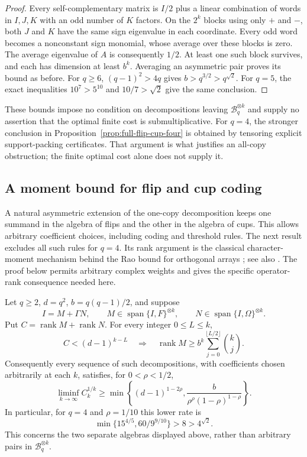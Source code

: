 \begin{proof}
Every self-complementary matrix is $I/2$ plus a linear combination
of words in $I,J,K$ with an odd number of $K$ factors. On the
$2^k$ blocks using only $+$ and $-$, both $J$ and $K$ have the
same sign eigenvalue in each coordinate. Every odd word becomes
a nonconstant sign monomial, whose average over these blocks is
zero. The average eigenvalue of $A$ is consequently $1/2$.
At least one such block survives, and each has dimension at least
$b^k$. Averaging an asymmetric pair proves its bound as before.
For $q\ge6$, $(q-1)^2>4q$ gives $b>q^{3/2}>q^{\sqrt2}$.
For $q=5$, the exact inequalities
$10^7>5^{10}$ and $10/7>\sqrt2$ give the same conclusion.
\end{proof}

These bounds impose no condition on decompositions leaving
$\mathcal B_q^{\otimes k}$ and supply no assertion that the optimal
finite cost is submultiplicative. For $q=4$, the stronger conclusion in
Proposition~\ref{prop:full-flip-cup-four} is obtained by tensoring
explicit support-packing certificates. That argument is what
justifies an all-copy obstruction; the finite optimal cost alone
does not supply it.

\subsection{A moment bound for flip and cup coding}

A natural asymmetric extension of the one-copy decomposition keeps
one summand in the algebra of flips and the other in the algebra of
cups. This allows arbitrary coefficient choices, including coding
and threshold rules. The next result excludes all such rules for
$q=4$. Its rank argument is the classical character-moment mechanism
behind the Rao bound for orthogonal arrays
\cite{Rao1947}; see also \cite[Section~3.4 and Theorem~4.1]{Stinson2018}.
The proof below permits arbitrary complex weights and gives the
specific operator-rank consequence needed here.

\begin{proposition}
\label{prop:flip-cup-separated-barrier}
Let $q\ge2$, $d=q^2$, $b=q(q-1)/2$, and suppose
\[
 I=M+\Gamma N,\qquad
 M\in\operatorname{span}\{I,F\}^{\otimes k},\qquad
 N\in\operatorname{span}\{I,\Omega\}^{\otimes k}.
\]
Put $C=\operatorname{rank}M+\operatorname{rank}N$.
For every integer $0\le L\le k$,
\[
 C<(d-1)^{k-L}
 \quad\Longrightarrow\quad
 \operatorname{rank}M\ge
 b^k\sum_{j=0}^{\lfloor L/2\rfloor}\binom{k}{j}.
\]
Consequently every sequence of such decompositions, with coefficients
chosen arbitrarily at each $k$, satisfies, for $0<\rho<1/2$,
\[
 \liminf_{k\to\infty}C_k^{1/k}
 \ge\min\left\{(d-1)^{1-2\rho},
       \frac{b}{\rho^\rho(1-\rho)^{1-\rho}}\right\}.
\]
In particular, for $q=4$ and $\rho=1/10$ this lower rate is
\[
 \min\{15^{4/5},60/9^{9/10}\}>8>4^{\sqrt2}.
\]
This concerns the two separate algebras displayed above, rather than
arbitrary pairs in $\mathcal B_q^{\otimes k}$.
\end{proposition}

